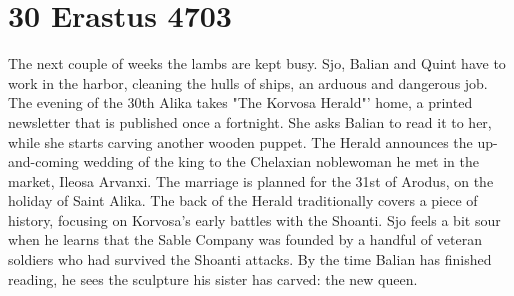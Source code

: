 \section{30 Erastus 4703}

The next couple of weeks the lambs are kept busy. Sjo, Balian and Quint have to work in the harbor, cleaning the hulls of ships, an arduous and dangerous job.\\

The evening of the 30th Alika takes "The Korvosa Herald"' home, a printed newsletter that is published once a fortnight. She asks Balian to read it to her, while she starts carving another wooden puppet. The Herald announces the up-and-coming wedding of the king to the Chelaxian noblewoman he met in the market, Ileosa Arvanxi. The marriage is planned for the 31st of Arodus, on the holiday of Saint Alika. The back of the Herald traditionally covers a piece of history, focusing on Korvosa's early battles with the Shoanti. Sjo feels a bit sour when he learns that the Sable Company was founded by a handful of veteran soldiers who had survived the Shoanti attacks. By the time Balian has finished reading, he sees the sculpture his sister has carved: the new queen.\\

